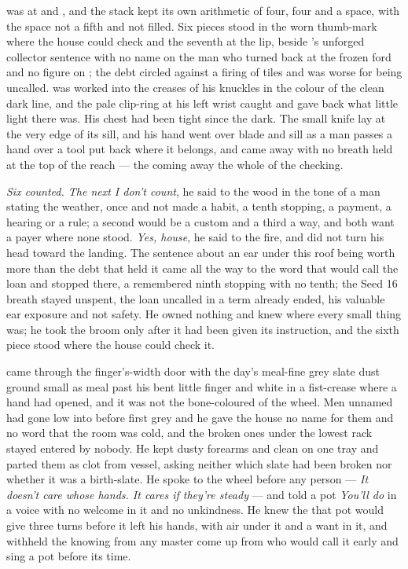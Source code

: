 \scenebreak

 was at  and , and the stack kept its own arithmetic of four, four and a space, with the space not a fifth and not filled. Six pieces stood in the worn thumb-mark where the house could check and the seventh at the lip, beside 's unforged collector sentence with no name on the man who turned back at the frozen ford and no figure on ; the debt circled against a firing of tiles and was worse for being uncalled.  was worked into the creases of his knuckles in the colour of the clean dark line, and the pale clip-ring at his left wrist caught and gave back what little light there was. His chest had been tight since the dark. The small knife lay at the very edge of its sill, and his hand went over blade and sill as a man passes a hand over a tool put back where it belongs, and came away with no breath held at the top of the reach --- the coming away the whole of the checking.

\emph{Six counted. The next I don't count}, he said to the wood in the tone of a man stating the weather, once and not made a habit, a tenth stopping, a payment, a hearing or a rule; a second would be a custom and a third a way, and both want a payer where none stood. \emph{Yes, house}, he said to the fire, and did not turn his head toward the landing. The sentence about an ear under this roof being worth more than the debt that held it came all the way to the word that would call the loan and stopped there, a remembered ninth stopping with no tenth; the Seed 16 breath stayed unspent, the loan uncalled in a term already ended, his valuable ear exposure and not safety. He owned nothing and knew where every small thing was; he took the broom only after it had been given its instruction, and the sixth piece stood where the house could check it.

\scenebreak

 came through the finger's-width door with the day's meal-fine grey slate dust ground small as meal past his bent little finger and white in a fist-crease where a hand had opened, and it was not the bone-coloured  of the wheel. Men unnamed had gone low into  before first grey and he gave the house no name for them and no word that the room was cold, and the broken ones under the lowest rack stayed entered by nobody. He kept dusty forearms and clean on one tray and parted them as clot from vessel, asking neither which slate had been broken nor whether it was a birth-slate. He spoke to the wheel before any person --- \emph{It doesn't care whose hands. It cares if they're steady} --- and told a pot \emph{You'll do} in a voice with no welcome in it and no unkindness. He knew the  that pot would give three turns before it left his hands, with air under it and a want in it, and withheld the knowing from any master come up from  who would call it early and sing a pot before its time.

